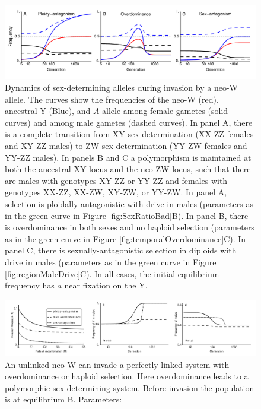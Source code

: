 \documentclass[12pt]{article}
\begin{document}
\begin{figure}[!h]
\centering
\centerline{
\includegraphics[width=\linewidth]{Freq_plot_combined_PloidAntag}
}
\caption{
Dynamics of sex-determining alleles during invasion by a neo-W allele. 
The curves show the frequencies of the neo-W (red), ancestral-Y (Blue), and $A$ allele among female gametes (solid curves) and among male gametes (dashed curves). 
In panel A, there is a complete transition from XY sex determination (XX-ZZ females and XY-ZZ males) to ZW sex determination (YY-ZW females and YY-ZZ males).  
In panels B and C a polymorphism is maintained at both the ancestral XY locus and the neo-ZW locus, such that there are males with genotypes XY-ZZ or YY-ZZ and females with genotypes XX-ZZ, XX-ZW, XY-ZW, or YY-ZW. 
In panel A, selection is ploidally antagonistic with drive in males (parameters as in the green curve in Figure \ref{fig:SexRatioBad}B).
In panel B, there is overdominance in both sexes and no haploid selection (parameters as in the green curve in Figure \ref{fig:temporalOverdominance}C).
In panel C, there is sexually-antagonistic selection in diploids with drive in males (parameters as in the green curve in Figure \ref{fig:regionMaleDrive}C).
In all cases, the initial equilibrium frequency has $a$ near fixation on the Y.
}
\label{fig:freqAll}
\end{figure}

\begin{figure}[!h]
\centering
\centerline{
\includegraphics[width=\linewidth]{neoW_invades_tight_loose}
}
\caption{
An unlinked neo-W can invade a perfectly linked system with overdominance or haploid selection.
Here overdominance leads to a polymorphic sex-determining system.
Before invasion the population is at equilibrium B.
Parameters:
}
\label{fig:loose_invades_tight}
\end{figure}
\end{document}
